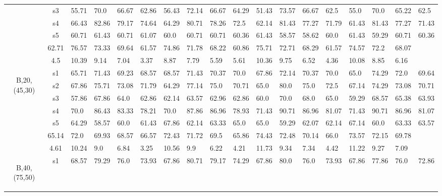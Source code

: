 \begin{table}[h]
{\begin{tabular}{cc|llll|llll|llll|llll}
 & s3 & 55.71 & 70.0 & 66.67 & 62.86 & 56.43 & 72.14 & 66.67 & 64.29 & 51.43 & 73.57 & 66.67 & 62.5 & 55.0 & 70.0 & 65.22 & 62.5 \\
 & s4 & 66.43 & 82.86 & 79.17 & 74.64 & 64.29 & 80.71 & 78.26 & 72.5 & 62.14 & 81.43 & 77.27 & 71.79 & 61.43 & 81.43 & 77.27 & 71.43 \\
 & s5 & 60.71 & 61.43 & 60.71 & 61.07 & 60.0 & 60.71 & 60.71 & 60.36 & 61.43 & 58.57 & 58.62 & 60.0 & 61.43 & 59.29 & 60.71 & 60.36 \\
\rowcolor{lightgray!50}\multicolumn{2}{r|}{avg} & 62.71 & 76.57 & 73.33 & 69.64 & 61.57 & 74.86 & 71.78 & 68.22 & 60.86 & 75.71 & 72.71 & 68.29 & 61.57 & 74.57 & 72.2 & 68.07 \\
\rowcolor{lightgray!50}\multicolumn{2}{r|}{std} & 4.5 & 10.39 & 9.14 & 7.04 & 3.37 & 8.87 & 7.79 & 5.59 & 5.61 & 10.36 & 9.75 & 6.52 & 4.36 & 10.08 & 8.85 & 6.16 \\
\multirow{6}{*}{\begin{sideways}B,20,(45,30)\end{sideways}} & s1 & 65.71 & 71.43 & 69.23 & 68.57 & 68.57 & 71.43 & 70.37 & 70.0 & 67.86 & 72.14 & 70.37 & 70.0 & 65.0 & 74.29 & 72.0 & 69.64 \\
 & s2 & 67.86 & 75.71 & 73.08 & 71.79 & 64.29 & 77.14 & 75.0 & 70.71 & 65.0 & 80.0 & 75.0 & 72.5 & 67.14 & 74.29 & 73.08 & 70.71 \\
 & s3 & 57.86 & 67.86 & 64.0 & 62.86 & 62.14 & 63.57 & 62.96 & 62.86 & 60.0 & 70.0 & 68.0 & 65.0 & 59.29 & 68.57 & 65.38 & 63.93 \\
 & s4 & 70.0 & 86.43 & 83.33 & 78.21 & 70.0 & 87.86 & 86.96 & 78.93 & 71.43 & 90.71 & 86.96 & 81.07 & 71.43 & 90.71 & 86.96 & 81.07 \\
 & s5 & 64.29 & 58.57 & 60.0 & 61.43 & 67.86 & 62.14 & 63.33 & 65.0 & 65.0 & 59.29 & 62.07 & 62.14 & 67.14 & 60.0 & 63.33 & 63.57 \\
\rowcolor{lightgray!50}\multicolumn{2}{r|}{avg} & 65.14 & 72.0 & 69.93 & 68.57 & 66.57 & 72.43 & 71.72 & 69.5 & 65.86 & 74.43 & 72.48 & 70.14 & 66.0 & 73.57 & 72.15 & 69.78 \\
\rowcolor{lightgray!50}\multicolumn{2}{r|}{std} & 4.61 & 10.24 & 9.0 & 6.84 & 3.25 & 10.56 & 9.9 & 6.22 & 4.21 & 11.73 & 9.34 & 7.34 & 4.42 & 11.22 & 9.27 & 7.09 \\
\multirow{6}{*}{\begin{sideways}B,40,(75,50)\end{sideways}} & s1 & 68.57 & 79.29 & 76.0 & 73.93 & 67.86 & 80.71 & 79.17 & 74.29 & 67.86 & 80.0 & 76.0 & 73.93 & 67.86 & 77.86 & 76.0 & 72.86 \\

\end{tabular}}
\end{table}
